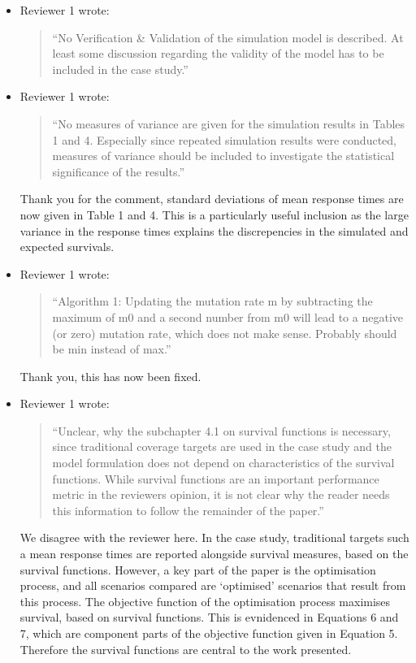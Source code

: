 \documentclass{article}
\begin{document}
\begin{itemize}

\item Reviewer 1 wrote:
\begin{quote}
``No Verification \& Validation of the simulation model is described. At least some discussion regarding the validity of the model has to be included in the case study.''
\end{quote}

\item Reviewer 1 wrote:
\begin{quote}
``No measures of variance are given for the simulation results in Tables 1 and 4. Especially since repeated simulation results were conducted, measures of variance should be included to investigate the statistical significance of the results.''
\end{quote}
Thank you for the comment, standard deviations of mean response times are now given in Table 1 and 4. This is a particularly useful inclusion as the large variance in the response times explains the discrepencies in the simulated and expected survivals.

\item Reviewer 1 wrote:
\begin{quote}
``Algorithm 1: Updating the mutation rate m by subtracting the maximum of m0 and a second number from m0 will lead to a negative (or zero) mutation rate, which does not make sense. Probably should be min instead of max.''
\end{quote}
Thank you, this has now been fixed.

\item Reviewer 1 wrote:
\begin{quote}
``Unclear, why the subchapter 4.1 on survival functions is necessary, since traditional coverage targets are used in the case study and the model formulation does not depend on characteristics of the survival functions. While survival functions are an important performance metric in the reviewers opinion, it is not clear why the reader needs this information to follow the remainder of the paper.''
\end{quote}
We disagree with the reviewer here. In the case study, traditional targets such a mean response times are reported alongside survival measures, based on the survival functions. However, a key part of the paper is the optimisation process, and all scenarios compared are `optimised' scenarios that result from this process. The objective function of the optimisation process maximises survival, based on survival functions. This is evnidenced in Equations 6 and 7, which are component parts of the objective function given in Equation 5. Therefore the survival functions are central to the work presented.


\end{itemize}
\end{document}
